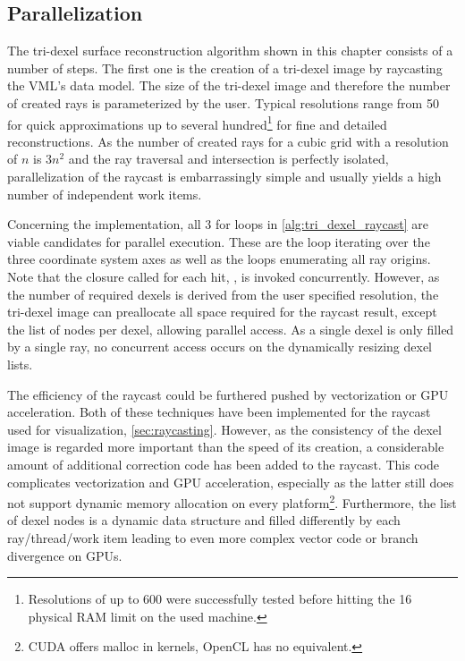 \subsection{Parallelization}
\label{sec:tri_dexel_parallelization}

The tri-dexel surface reconstruction algorithm shown in this chapter consists of a number of steps.
The first one is the creation of a tri-dexel image by raycasting the VML's data model.
The size of the tri-dexel image and therefore the number of created rays is parameterized by the user.
Typical resolutions range from 50 for quick approximations up to several hundred\footnote{Resolutions of up to 600 were successfully tested before hitting the \SI{16}{\gibi\byte} physical RAM limit on the used machine.} for fine and detailed reconstructions.
As the number of created rays for a cubic grid with a resolution of $n$ is $3n^2$ and the ray traversal and intersection is perfectly isolated, parallelization of the raycast is embarrassingly simple and usually yields a high number of independent work items.

Concerning the implementation, all 3 for loops in \cref{alg:tri_dexel_raycast} are viable candidates for parallel execution.
These are the loop iterating over the three coordinate system axes as well as the loops enumerating all ray origins.
Note that the closure called for each hit, , is invoked concurrently.
However, as the number of required dexels is derived from the user specified resolution, the tri-dexel image can preallocate all space required for the raycast result, except the list of nodes per dexel, allowing parallel access.
As a single dexel is only filled by a single ray, no concurrent access occurs on the dynamically resizing dexel lists.

The efficiency of the raycast could be furthered pushed by vectorization or GPU acceleration.
Both of these techniques have been implemented for the raycast used for visualization, \cf \cref{sec:raycasting}.
However, as the consistency of the dexel image is regarded more important than the speed of its creation, a considerable amount of additional correction code has been added to the raycast.
This code complicates vectorization and GPU acceleration, especially as the latter still does not support dynamic memory allocation on every platform\footnote{CUDA offers malloc in kernels, OpenCL has no equivalent.}.
Furthermore, the list of dexel nodes is a dynamic data structure and filled differently by each ray/thread/work item leading to even more complex vector code or branch divergence on GPUs.


